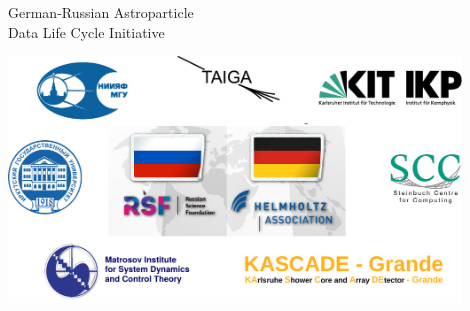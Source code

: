 
\begin{frame}{German-Russian Astroparticle \\Data Life Cycle Initiative\footnotemark[1]}
\vspace{-1.4em}
\begin{center}
  \includegraphics[width=0.9\textwidth]{pics/Collab-4.pdf}
\end{center}
\footnotesize{}
\end{frame}

% 
% 
